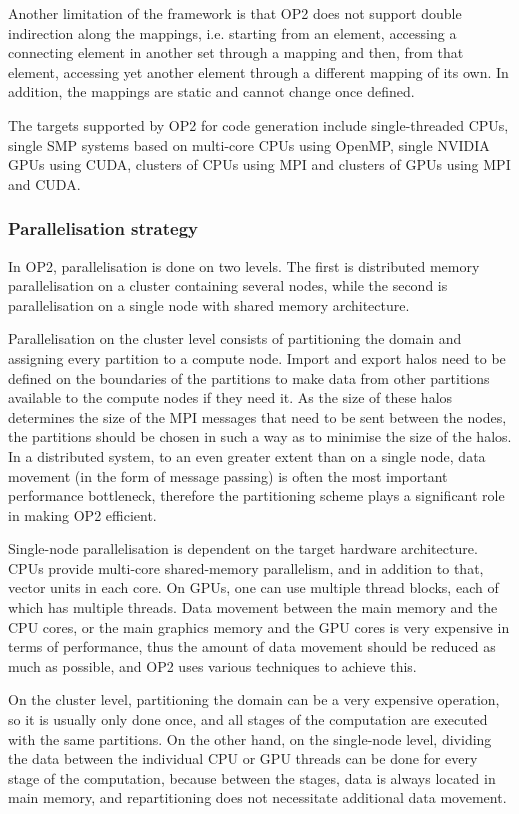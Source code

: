 \documentclass[fontsize=11pt, appendixprefix=true]{scrreprt}
\begin{document}
Another limitation of the framework is that OP2 does not support double
indirection along the mappings, i.e. starting from an element, accessing a
connecting element in another set through a mapping and then, from that element,
accessing yet another element through a different mapping of its own. In
addition, the mappings are static and cannot change once defined.

The targets supported by OP2 for code generation include single-threaded CPUs,
single SMP systems based on multi-core CPUs using OpenMP, single NVIDIA GPUs
using CUDA, clusters of CPUs using MPI and clusters of GPUs using MPI and CUDA.

\subsubsection{Parallelisation strategy}

In OP2, parallelisation is done on two levels. The first is distributed memory
parallelisation on a cluster containing several nodes, while the second is
parallelisation on a single node with shared memory architecture.

Parallelisation on the cluster level consists of partitioning the domain and
assigning every partition to a compute node. Import and export halos need to be
defined on the boundaries of the partitions to make data from other partitions
available to the compute nodes if they need it. As the size of these halos
determines the size of the MPI messages that need to be sent between the nodes,
the partitions should be chosen in such a way as to minimise the size of the
halos. In a distributed system, to an even greater extent than on a single node,
data movement (in the form of message passing) is often the most important
performance bottleneck, therefore the partitioning scheme plays a significant
role in making OP2 efficient.

Single-node parallelisation is dependent on the target hardware
architecture. CPUs provide multi-core shared-memory parallelism, and in addition
to that, vector units in each core. On GPUs, one can use multiple thread blocks,
each of which has multiple threads. Data movement between the main memory and
the CPU cores, or the main graphics memory and the GPU cores is very expensive
in terms of performance, thus the amount of data movement should be reduced as
much as possible, and OP2 uses various techniques to achieve this.

On the cluster level, partitioning the domain can be a very expensive operation,
so it is usually only done once, and all stages of the computation are executed
with the same partitions. On the other hand, on the single-node level, dividing
the data between the individual CPU or GPU threads can be done for every stage
of the computation, because between the stages, data is always located in main
memory, and repartitioning does not necessitate additional data movement.
\end{document}

